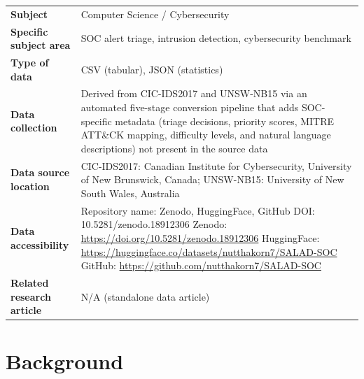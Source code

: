 \documentclass[review]{elsarticle}
\begin{document}
\begin{table}[h]
\small
\begin{tabular}{p{4cm} p{9cm}}
\toprule
\textbf{Subject} & Computer Science / Cybersecurity \\
\textbf{Specific subject area} & SOC alert triage, intrusion detection, cybersecurity benchmark \\
\textbf{Type of data} & CSV (tabular), JSON (statistics) \\
\textbf{Data collection} & Derived from CIC-IDS2017 and UNSW-NB15 via an automated five-stage conversion pipeline that adds SOC-specific metadata (triage decisions, priority scores, MITRE ATT\&CK mapping, difficulty levels, and natural language descriptions) not present in the source data \\
\textbf{Data source location} & CIC-IDS2017: Canadian Institute for Cybersecurity, University of New Brunswick, Canada; UNSW-NB15: University of New South Wales, Australia \\
\textbf{Data accessibility} & Repository name: Zenodo, HuggingFace, GitHub \newline DOI: 10.5281/zenodo.18912306 \newline Zenodo: \url{https://doi.org/10.5281/zenodo.18912306} \newline HuggingFace: \url{https://huggingface.co/datasets/nutthakorn7/SALAD-SOC} \newline GitHub: \url{https://github.com/nutthakorn7/SALAD-SOC} \\
\textbf{Related research article} & N/A (standalone data article) \\
\bottomrule
\end{tabular}
\end{table}


\section{Background}
\end{document}
